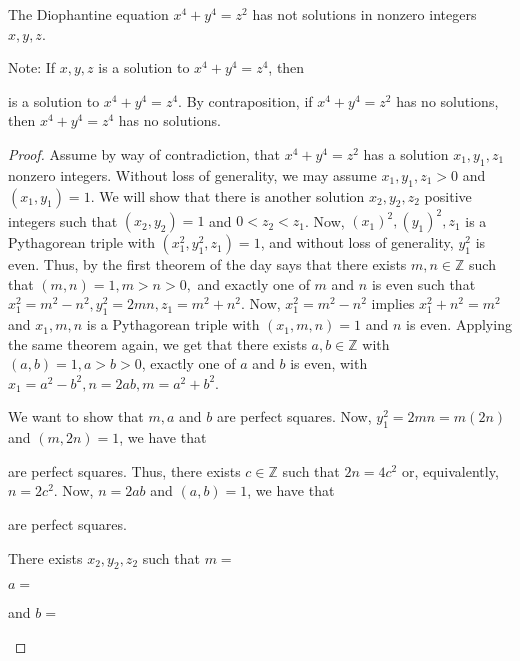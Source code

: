 \documentclass{ximera}
\begin{document}
\begin{theorem}
 The Diophantine equation $x^4+y^4=z^2$ has not solutions in nonzero integers $x,y,z$.
\end{theorem}
Note: If $x,y,z$ is a solution to $x^4+y^4=z^4$, then 
\begin{multipleChoice}
\end{multipleChoice}
is a solution to $x^4+y^4=z^4$. By contraposition, if $x^4+y^4=z^2$ has no solutions, then $x^4+y^4=z^4$ has no solutions. 

\begin{proof}
 Assume by way of contradiction, that $x^4+y^4=z^2$ has a solution $x_1,y_1, z_1$ nonzero integers. Without loss of generality, we may assume $x_1,y_1,z_1>0$ and $(x_1,y_1)=1$. We will show that there is another solution $x_2,y_2,z_2$ positive integers such that $(x_2,y_2)=1$ and $0<z_2<z_1$. Now, $(x_1)^2,(y_1)^2, z_1$ is a Pythagorean triple with $(x_1^2,y_1^2,z_1)=1$, and without loss of generality, $y_1^2$ is even. Thus, by the first theorem of the day says that there exists $m,n\in\mathbb{Z}$ such that $(m,n)=1,m>n>0,$ and exactly one of $m$ and $n$ is even such that $x_1^2=m^2-n^2, y_1^2=2mn, z_1=m^2+n^2$. Now, $x_1^2=m^2-n^2$ implies $x_1^2+n^2=m^2$ and $x_1,m,n$ is a Pythagorean triple with $(x_1,m,n)=1$ and $n$ is even. Applying the same theorem again, we get that there exists $a,b\in\mathbb{Z}$ with $(a,b)=1,a>b>0$, exactly one of $a$ and $b$ is even, with $x_1=a^2-b^2, n=2ab, m=a^2+b^2$. 
 
 We want to show that $m,a$ and $b$ are perfect squares. Now, $y_1^2=2mn=m(2n)$ and $(m,2n)=1$, we have that 
\begin{selectAll}
\end{selectAll}
are perfect squares. Thus, there exists $c\in\mathbb{Z}$ such that $2n=4c^2$ or, equivalently, $n=2c^2$. Now, $n=2ab$ and $(a,b)=1$, we have that
\begin{selectAll}
\end{selectAll}
are perfect squares. 

There exists $x_2,y_2,z_2$ such that $m=$
\begin{multipleChoice}
\end{multipleChoice}
$a=$
\begin{multipleChoice}
\end{multipleChoice}
and $b=$
\begin{multipleChoice}
\end{multipleChoice}


\end{proof}
\end{document}
